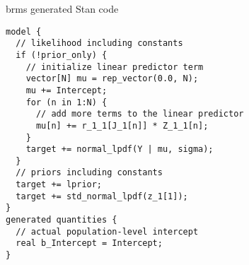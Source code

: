 \documentclass[finnish,english,t]{beamer}
\DeclareMathOperator{\N}{N}
\begin{document}
\begin{frame}[fragile]{brms generated Stan code}

  \vspace{-\baselineskip}
\begin{verbatim}
model {
  // likelihood including constants
  if (!prior_only) {
    // initialize linear predictor term
    vector[N] mu = rep_vector(0.0, N);
    mu += Intercept;
    for (n in 1:N) {
      // add more terms to the linear predictor
      mu[n] += r_1_1[J_1[n]] * Z_1_1[n];
    }
    target += normal_lpdf(Y | mu, sigma);
  }
  // priors including constants
  target += lprior;
  target += std_normal_lpdf(z_1[1]);
}
generated quantities {
  // actual population-level intercept
  real b_Intercept = Intercept;
}
\end{verbatim}

\end{frame}


\end{document}
